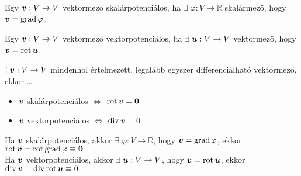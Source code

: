 \documentclass[main.tex]{subfiles}
\begin{document}

Egy $\boldsymbol{v}: V \rightarrow V$ vektormező skalárpotenciálos,
ha $\exists \; \varphi : V \rightarrow \mathbb{R}$ skalármező,
hogy $\boldsymbol{v} = \operatorname{grad} \varphi$.




Egy $\boldsymbol{v}: V \rightarrow V$ vektormező vektorpotenciálos,
ha $\exists \; \boldsymbol{u} : V \rightarrow V$ vektormező,
hogy $\boldsymbol{v} = \operatorname{rot} \boldsymbol{u}$.




$! \; \boldsymbol{v}: V \rightarrow V$ mindenhol értelmezett,
legalább egyszer differenciálható vektormező, ekkor \dots
\begin{itemize}
  \item $\boldsymbol{v}$ skalárpotenciálos
        \tabto{3.8cm} $\Leftrightarrow$ \tabto{4.5cm}
        $\operatorname{rot} \boldsymbol{v} = \boldsymbol{0}$

  \item $\boldsymbol{v}$ vektorpotenciálos
        \tabto{3.8cm} $\Leftrightarrow$ \tabto{4.5cm}
        $\operatorname{div} \boldsymbol{v} = 0$
\end{itemize}




Ha $\boldsymbol{v}$ skalárpotenciálos, akkor
$\exists \; \varphi : V \rightarrow \mathbb{R}$,
hogy $\boldsymbol{v} = \operatorname{grad} \varphi$, ekkor
$\operatorname{rot} \boldsymbol{v} = \operatorname{rot} \operatorname{grad} \varphi \equiv \boldsymbol{0}$
\\[.33em]
Ha $\boldsymbol{v}$ vektorpotenciálos, akkor
$\exists \; \boldsymbol{u} : V \rightarrow V$,
hogy $\boldsymbol{v} = \operatorname{rot} \boldsymbol{u}$, ekkor
$\operatorname{div} \boldsymbol{v} = \operatorname{div} \operatorname{rot} \boldsymbol{u} \equiv 0$



\end{document}
